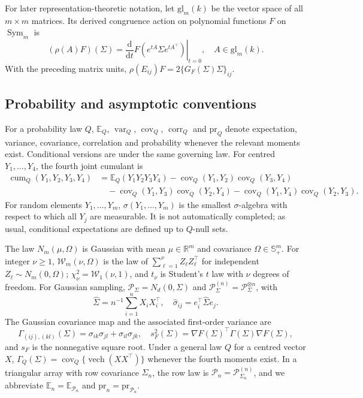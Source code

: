 \documentclass[12pt,a4paper]{article}
\theoremstyle{plain}
\theoremstyle{definition}
\newcommand{\R}{\mathbb{R}}
\newcommand{\E}{\mathbb{E}}
\newcommand{\Smat}{\mathbb{S}}
\newcommand{\Sym}{\operatorname{Sym}}
\newcommand{\vech}{\operatorname{vech}}
\newcommand{\var}{\operatorname{var}}
\newcommand{\cov}{\operatorname{cov}}
\newcommand{\corr}{\operatorname{corr}}
\newcommand{\cum}{\operatorname{cum}}
\newcommand{\pr}{\mathrm{pr}}
\newcommand{\Sighat}{\hat{\Sigma}}
\begin{document}
For later representation-theoretic notation, let $\mathrm{gl}_m(k)$ be the vector space of all $m\times m$ matrices.
Its derived congruence action on polynomial functions $F$ on $\Sym_m$ is
\begin{equation*}
    (\rho(A)F)(\Sigma)
    =
    \left.\frac{\mathrm{d}}{\mathrm{d}t}
    F(e^{tA}\Sigma e^{tA^\top})\right|_{t=0}
    ,
    \quad
    A\in\mathrm{gl}_m(k)
    .
\end{equation*}
With the preceding matrix units, $\rho(E_{ij})F=2\{G_F(\Sigma)\Sigma\}_{ij}$.

\subsection{Probability and asymptotic conventions}

For a probability law $Q$, $\E_Q$, $\var_Q$, $\cov_Q$, $\corr_Q$ and $\pr_Q$ denote expectation, variance, covariance, correlation and probability whenever the relevant moments exist.
Conditional versions are under the same governing law.
For centred $Y_1,\ldots,Y_4$, the fourth joint cumulant is
\begin{equation*}
    \begin{split}
        \cum_Q(Y_1,Y_2,Y_3,Y_4)
        &=
        \E_Q(Y_1Y_2Y_3Y_4)
        -\cov_Q(Y_1,Y_2)\cov_Q(Y_3,Y_4)
        \\
        &\quad-\cov_Q(Y_1,Y_3)\cov_Q(Y_2,Y_4)
        -\cov_Q(Y_1,Y_4)\cov_Q(Y_2,Y_3)
        .
    \end{split}
\end{equation*}
For random elements $Y_1,\ldots,Y_m$, $\sigma(Y_1,\ldots,Y_m)$ is the smallest $\sigma$-algebra with respect to which all $Y_j$ are measurable.
It is not automatically completed; as usual, conditional expectations are defined up to $Q$-null sets.

The law $N_m(\mu,\Omega)$ is Gaussian with mean $\mu\in\R^m$ and covariance $\Omega\in\Smat^m_+$.
For integer $\nu\ge1$, $\mathcal{W}_m(\nu,\Omega)$ is the law of $\sum_{\ell=1}^{\nu}Z_\ell Z_\ell^\top$ for independent $Z_\ell\sim N_m(0,\Omega)$; $\chi^2_\nu=\mathcal{W}_1(\nu,1)$, and $t_\nu$ is Student's $t$ law with $\nu$ degrees of freedom.
For Gaussian sampling, $\mathcal{P}_\Sigma=N_d(0,\Sigma)$ and $\mathcal{P}_\Sigma^{(n)}=\mathcal{P}_\Sigma^{\otimes n}$, with
\begin{equation*}
    \Sighat
    =
    n^{-1}\sum_{i=1}^nX_iX_i^\top
    ,
    \quad
    \hat{\sigma}_{ij}
    =
    e_i^\top\Sighat e_j
    .
\end{equation*}
The Gaussian covariance map and the associated first-order variance are
\begin{equation*}
    \Gamma_{(ij),(kl)}(\Sigma)
    =
    \sigma_{ik}\sigma_{jl}+\sigma_{il}\sigma_{jk}
    ,
    \quad
    s_F^2(\Sigma)
    =
    \nabla F(\Sigma)^\top\Gamma(\Sigma)\nabla F(\Sigma)
    ,
\end{equation*}
and $s_F$ is the nonnegative square root.
Under a general law $Q$ for a centred vector $X$, $\Gamma_Q(\Sigma)=\cov_Q\{\vech(XX^\top)\}$ whenever the fourth moments exist.
In a triangular array with row covariance $\Sigma_n$, the row law is $\mathcal{P}_n=\mathcal{P}_{\Sigma_n}^{(n)}$, and we abbreviate $\E_n=\E_{\mathcal{P}_n}$ and $\pr_n=\pr_{\mathcal{P}_n}$.
\end{document}
